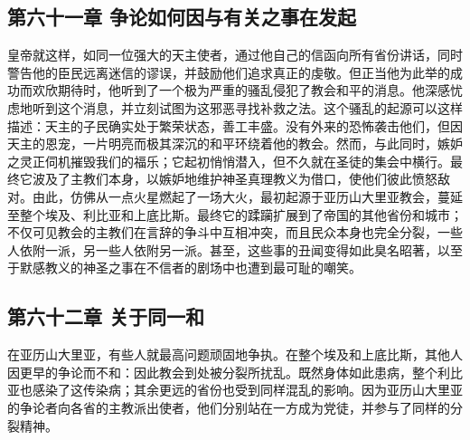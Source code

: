 \par


\subsection{第六十一章 争论如何因与有关之事在发起}

皇帝就这样，如同一位强大的天主使者，通过他自己的信函向所有省份讲话，同时警告他的臣民远离迷信的谬误，并鼓励他们追求真正的虔敬。但正当他为此举的成功而欢欣期待时，他听到了一个极为严重的骚乱侵犯了教会和平的消息。他深感忧虑地听到这个消息，并立刻试图为这邪恶寻找补救之法。这个骚乱的起源可以这样描述：天主的子民确实处于繁荣状态，善工丰盛。没有外来的恐怖袭击他们，但因天主的恩宠，一片明亮而极其深沉的和平环绕着他的教会。然而，与此同时，嫉妒之灵正伺机摧毁我们的福乐；它起初悄悄潜入，但不久就在圣徒的集会中横行。最终它波及了主教们本身，以嫉妒地维护神圣真理教义为借口，使他们彼此愤怒敌对。由此，仿佛从一点火星燃起了一场大火，最初起源于亚历山大里亚教会，蔓延至整个埃及、利比亚和上底比斯。最终它的蹂躏扩展到了帝国的其他省份和城市；不仅可见教会的主教们在言辞的争斗中互相冲突，而且民众本身也完全分裂，一些人依附一派，另一些人依附另一派。甚至，这些事的丑闻变得如此臭名昭著，以至于默感教义的神圣之事在不信者的剧场中也遭到最可耻的嘲笑。\par


\subsection{第六十二章 关于同一和}

在亚历山大里亚，有些人就最高问题顽固地争执。在整个埃及和上底比斯，其他人因更早的争论而不和：因此教会到处被分裂所扰乱。既然身体如此患病，整个利比亚也感染了这传染病；其余更远的省份也受到同样混乱的影响。因为亚历山大里亚的争论者向各省的主教派出使者，他们分别站在一方成为党徒，并参与了同样的分裂精神。\par

